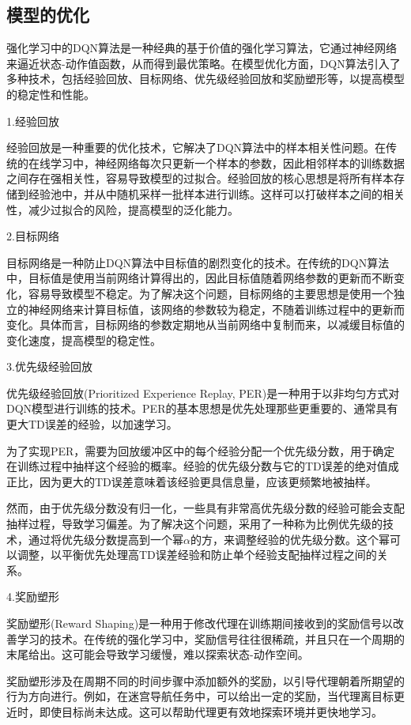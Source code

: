 \subsection{模型的优化}

强化学习中的DQN算法是一种经典的基于价值的强化学习算法，它通过神经网络来逼近状态-动作值函数，从而得到最优策略。在模型优化方面，DQN算法引入了多种技术，包括经验回放、目标网络、优先级经验回放和奖励塑形等，以提高模型的稳定性和性能。

1.经验回放

经验回放是一种重要的优化技术，它解决了DQN算法中的样本相关性问题。在传统的在线学习中，神经网络每次只更新一个样本的参数，因此相邻样本的训练数据之间存在强相关性，容易导致模型的过拟合。经验回放的核心思想是将所有样本存储到经验池中，并从中随机采样一批样本进行训练。这样可以打破样本之间的相关性，减少过拟合的风险，提高模型的泛化能力。

2.目标网络

目标网络是一种防止DQN算法中目标值的剧烈变化的技术。在传统的DQN算法中，目标值是使用当前网络计算得出的，因此目标值随着网络参数的更新而不断变化，容易导致模型不稳定。为了解决这个问题，目标网络的主要思想是使用一个独立的神经网络来计算目标值，该网络的参数较为稳定，不随着训练过程中的更新而变化。具体而言，目标网络的参数定期地从当前网络中复制而来，以减缓目标值的变化速度，提高模型的稳定性。

3.优先级经验回放

优先级经验回放(Prioritized Experience Replay, PER)是一种用于以非均匀方式对DQN模型进行训练的技术。PER的基本思想是优先处理那些更重要的、通常具有更大TD误差的经验，以加速学习。

为了实现PER，需要为回放缓冲区中的每个经验分配一个优先级分数，用于确定在训练过程中抽样这个经验的概率。经验的优先级分数与它的TD误差的绝对值成正比，因为更大的TD误差意味着该经验更具信息量，应该更频繁地被抽样。

然而，由于优先级分数没有归一化，一些具有非常高优先级分数的经验可能会支配抽样过程，导致学习偏差。为了解决这个问题，采用了一种称为比例优先级的技术，通过将优先级分数提高到一个幂$\alpha$的方，来调整经验的优先级分数。这个幂可以调整，以平衡优先处理高TD误差经验和防止单个经验支配抽样过程之间的关系。

4.奖励塑形

奖励塑形(Reward Shaping)是一种用于修改代理在训练期间接收到的奖励信号以改善学习的技术。在传统的强化学习中，奖励信号往往很稀疏，并且只在一个周期的末尾给出。这可能会导致学习缓慢，难以探索状态-动作空间。

奖励塑形涉及在周期不同的时间步骤中添加额外的奖励，以引导代理朝着所期望的行为方向进行。例如，在迷宫导航任务中，可以给出一定的奖励，当代理离目标更近时，即使目标尚未达成。这可以帮助代理更有效地探索环境并更快地学习。

